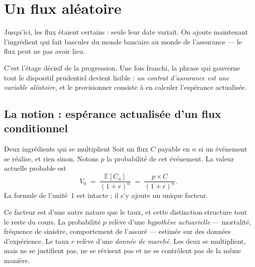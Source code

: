 \section{Un flux aléatoire}
\label{sec:U4}

Jusqu'ici, les flux étaient certains : seule leur date variait. On ajoute
maintenant l'ingrédient qui fait basculer du monde bancaire au monde de
l'assurance --- le flux peut ne pas avoir lieu.

C'est l'étage décisif de la progression. Une fois franchi, la phrase qui
gouverne tout le dispositif prudentiel devient lisible : \emph{un contrat
d'assurance est une variable aléatoire}, et le provisionner consiste à en
calculer l'espérance actualisée.

\subsection{La notion : espérance actualisée d'un flux conditionnel}

\begin{notion}{Deux ingrédients qui se multiplient}
Soit un flux $C$ payable en $n$ si un événement se réalise, et rien sinon.
Notons $p$ la probabilité de cet événement. La valeur actuelle probable est
\[
  V_0 \;=\; \frac{\mathbb{E}[C_n]}{(1+r)^n} \;=\; \frac{p \times C}{(1+r)^n} .
\]
La formule de l'unité~1 est intacte ; il s'y ajoute un unique facteur.

\medskip
Ce facteur est d'une autre nature que le taux, et cette distinction structure
tout le reste du cours. La probabilité $p$ relève d'une \emph{hypothèse
actuarielle} --- mortalité, fréquence de sinistre, comportement de l'assuré ---
estimée sur des données d'expérience. Le taux $r$ relève d'une \emph{donnée de
marché}. Les deux se multiplient, mais ne se justifient pas, ne se révisent pas
et ne se contrôlent pas de la même manière.
\end{notion}

\begin{center}
\end{center}

